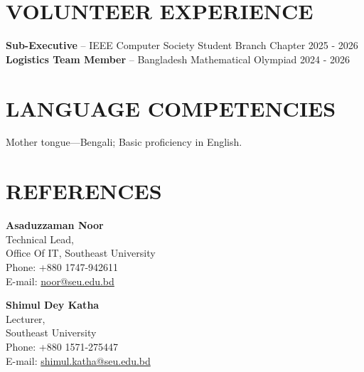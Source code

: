 \documentclass[11pt,a4paper]{article}
\begin{document}
\section*{VOLUNTEER EXPERIENCE}
\textbf{Sub-Executive} -- IEEE Computer Society Student Branch Chapter \hfill 2025 - 2026\\[0.2em]
\textbf{Logistics Team Member} -- Bangladesh Mathematical Olympiad \hfill 2024 - 2026

\section*{LANGUAGE COMPETENCIES}
Mother tongue---Bengali; Basic proficiency in English.

\section*{REFERENCES}
\begin{minipage}[t]{0.35\textwidth}
\textbf{Asaduzzaman Noor}\\
Technical Lead,\\
Office Of IT, Southeast University\\
Phone: +880 1747-942611\\
E-mail: \href{mailto:noor@seu.edu.bd}{noor@seu.edu.bd}
\end{minipage}
\hfill
\begin{minipage}[t]{0.35\textwidth}
\textbf{Shimul Dey Katha}\\
Lecturer,\\
Southeast University\\
Phone: +880 1571-275447\\
E-mail: \href{mailto:shimul.katha@seu.edu.bd}{shimul.katha@seu.edu.bd}
\end{minipage}
\end{document}
